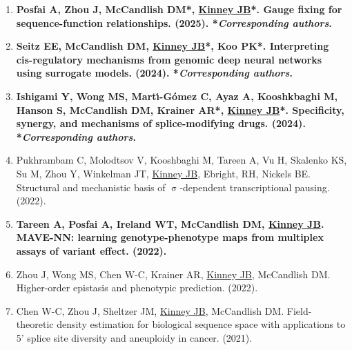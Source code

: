 \documentclass[10pt,hidelinks]{article}
\begin{document}
\begin{enumerate}
\item \textbf{Posfai A, Zhou J, McCandlish DM*, \underline{Kinney JB}*. Gauge fixing for sequence-function relationships.  (2025). *\textit{Corresponding authors}.}

\item \textbf{Seitz EE, McCandlish DM, \underline{Kinney JB}*, Koo PK*. Interpreting cis-regulatory mechanisms from genomic deep neural networks using surrogate models.  (2024). *\textit{Corresponding authors}.}

\item \textbf{Ishigami Y, Wong MS, Mart{\'\i}-G{\'o}mez C, Ayaz A, Kooshkbaghi M, Hanson S, McCandlish DM, Krainer AR*, \underline{Kinney JB}*. Specificity, synergy, and mechanisms of splice-modifying drugs.  (2024). *\textit{Corresponding authors}.}
  
\item Pukhrambam C, Molodtsov V, Kooshbaghi M, Tareen A, Vu H, Skalenko KS, Su M, Zhou Y, Winkelman JT, \underline{Kinney JB}, Ebright, RH, Nickels BE. Structural and mechanistic basis of $\upsigma$-dependent transcriptional pausing.  (2022).
  
\item \textbf{Tareen A, Posfai A, Ireland WT, McCandlish DM, \underline{Kinney JB}. MAVE-NN: learning genotype-phenotype maps from multiplex assays of variant effect.  (2022).}
  
\item Zhou J, Wong MS, Chen W-C, Krainer AR, \underline{Kinney JB}, McCandlish DM. Higher-order epistasis and phenotypic prediction.  (2022).
  
\item Chen W-C, Zhou J, Sheltzer JM, \underline{Kinney JB}, McCandlish DM. Field-theoretic density estimation for biological sequence space with applications to 5' splice site diversity and aneuploidy in cancer.  (2021).  


\end{enumerate}
\end{document}
